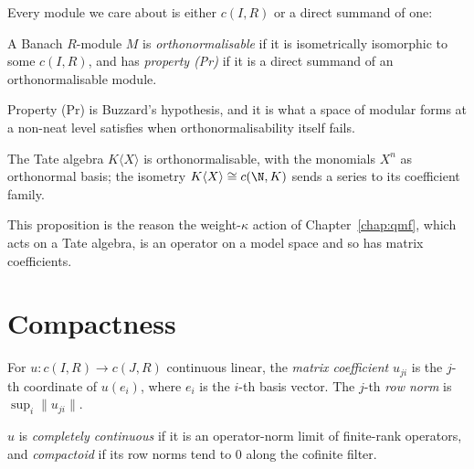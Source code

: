 Every module we care about is either $c(I,R)$ or a direct summand of one:

\begin{definition}
  \label{def:onable}
  \leanok
  A Banach $R$-module $M$ is \emph{orthonormalisable} if it is isometrically isomorphic to some
  $c(I,R)$, and has \emph{property (Pr)} if it is a direct summand of an orthonormalisable
  module.
\end{definition}

Property (Pr) is Buzzard's hypothesis, and it is what a space of modular forms at a non-neat
level satisfies when orthonormalisability itself fails.

\begin{proposition}
  \label{prop:tate-algebra-onable}
  \leanok
  The Tate algebra $K\langle X \rangle$ is orthonormalisable, with the monomials $X^n$ as
  orthonormal basis; the isometry $K\langle X\rangle \cong c(\N, K)$ sends a series to its
  coefficient family.
\end{proposition}

This proposition is the reason the weight-$\kappa$ action of Chapter~\ref{chap:qmf}, which acts
on a Tate algebra, is an operator on a model space and so has matrix coefficients.

\section{Compactness}

\begin{definition}
  \label{def:matrixcoeff}
  \leanok
  For $u : c(I,R) \to c(J,R)$ continuous linear, the \emph{matrix coefficient} $u_{j i}$ is the
  $j$-th coordinate of $u(e_i)$, where $e_i$ is the $i$-th basis vector.  The $j$-th
  \emph{row norm} is $\sup_i \lVert u_{ji}\rVert$.
\end{definition}

\begin{definition}
  \label{def:iscompactoid}
  \leanok
  $u$ is \emph{completely continuous} if it is an operator-norm limit of finite-rank operators,
  and \emph{compactoid} if its row norms tend to $0$ along the cofinite filter.
\end{definition}

